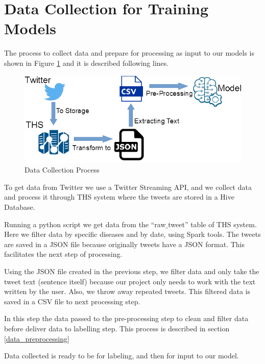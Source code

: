 \documentclass[12pt]{report}
\begin{document}
\section{Data Collection for Training Models}

The process to collect data and prepare for processing as  input to our models is shown in Figure \ref{figure:data_collection} and it is described following lines.

\begin{figure}[H]	
	\centering
	\includegraphics[width=150mm, scale = 1]{images/8_data_collection.png}	
	\caption{Data Collection Process }	
	\label{figure:data_collection}
\end{figure}

\begin{steps}
	
	\item  To get data from Twitter we use a Twitter Streaming \ac{API}, and we collect data and  process it through \ac{THS} system where the tweets are stored in a Hive Database.
	
	\item Running a python script we get data from  the ``raw$\_$tweet'' table of \ac{THS} system. Here we filter data by specific diseases and by date, 
	using Spark tools. The tweets are saved  in a \ac{JSON} file because originally tweets have a \ac{JSON} format. This facilitates the next step of processing.
	
	\item Using the  \ac{JSON}  file created in the previous step, we filter data and only take the tweet text (sentence itself) because our project only needs to work with the text written by the user. Also, we throw away repeated tweets. This filtered data is saved in a \ac{CSV} file to next processing step.
	
	\item In this step the data passed to the pre-processing step to clean and filter data before deliver data to labelling step. This process is described in section \ref{data_preprocessing} 
	
	\item Data collected is ready to be for labeling, and then for input to our model.
	
\end{steps}
\end{document}

